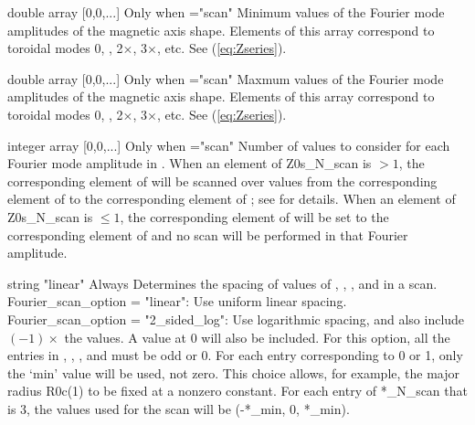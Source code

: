 \myhrule

{double array}
{[0,0,...]}
{Only when ={\ttfamily "scan"}}
{Minimum values of the Fourier mode amplitudes of the magnetic axis shape. Elements of this array correspond to toroidal modes 0, , 2$\times$, 3$\times$, etc.  See (\ref{eq:Zseries}).
}

\myhrule

{double array}
{[0,0,...]}
{Only when ={\ttfamily "scan"}}
{Maxmum values of the Fourier mode amplitudes of the magnetic axis shape. Elements of this array correspond to toroidal modes 0, , 2$\times$, 3$\times$, etc.  See (\ref{eq:Zseries}).
}

\myhrule

{integer array}
{[0,0,...]}
{Only when ={\ttfamily "scan"}}
{Number of values to consider for each Fourier mode amplitude in . When an element of {\ttfamily Z0s\_N\_scan} is $>1$, the corresponding element of  will be scanned over  values from the corresponding element of  to the corresponding element of ; see  for details.  When an element of {\ttfamily Z0s\_N\_scan} is $\le 1$, the corresponding element of  will be set to the corresponding element of  and no scan will be performed in that Fourier amplitude.
}

\myhrule

{string}
{{\ttfamily "linear"}}
{Always}
{Determines the spacing of values of , , , and  in a scan.\\

{\ttfamily Fourier\_scan\_option} = {\ttfamily "linear"}: Use uniform linear spacing.\\

{\ttfamily Fourier\_scan\_option} = {\ttfamily "2\_sided\_log"}: Use logarithmic spacing, and also include $(-1)\times$ the values. A value at 0 will also be included. 
For this option, all the entries in , , , and  must be odd or 0. 
For each entry corresponding to 0 or 1, only the `min' value will be used, not zero. This choice allows, for example, the major radius R0c(1) to be fixed at a nonzero constant.
For each entry of *\_N\_scan that is 3, the values used for the scan will be (-*\_min, 0, *\_min).
}

